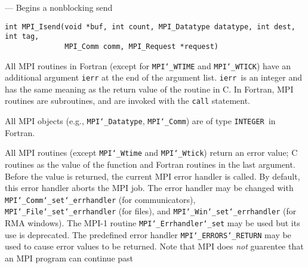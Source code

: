 \startmanpage
{}
--- Begins a nonblocking send 
\startvb\begin{verbatim}
int MPI_Isend(void *buf, int count, MPI_Datatype datatype, int dest, int tag,
              MPI_Comm comm, MPI_Request *request)

\end{verbatim}
\endvb

\par
{}
\par
{}
All MPI routines in Fortran (except for {\tt MPI{\tt \char`\_}WTIME} and {\tt MPI{\tt \char`\_}WTICK}) have
an additional argument {\tt ierr} at the end of the argument list.  {\tt ierr
}is an integer and has the same meaning as the return value of the routine
in C.  In Fortran, MPI routines are subroutines, and are invoked with the
{\tt call} statement.
\par
All MPI objects (e.g., {\tt MPI{\tt \char`\_}Datatype}, {\tt MPI{\tt \char`\_}Comm}) are of type {\tt INTEGER
}in Fortran.
\par
{}
\par
All MPI routines (except {\tt MPI{\tt \char`\_}Wtime} and {\tt MPI{\tt \char`\_}Wtick}) return an error value;
C routines as the value of the function and Fortran routines in the last
argument.  Before the value is returned, the current MPI error handler is
called.  By default, this error handler aborts the MPI job.  The error handler
may be changed with {\tt MPI{\tt \char`\_}Comm{\tt \char`\_}set{\tt \char`\_}errhandler} (for communicators),
{\tt MPI{\tt \char`\_}File{\tt \char`\_}set{\tt \char`\_}errhandler} (for files), and {\tt MPI{\tt \char`\_}Win{\tt \char`\_}set{\tt \char`\_}errhandler} (for
RMA windows).  The MPI-1 routine {\tt MPI{\tt \char`\_}Errhandler{\tt \char`\_}set} may be used but
its use is deprecated.  The predefined error handler
{\tt MPI{\tt \char`\_}ERRORS{\tt \char`\_}RETURN} may be used to cause error values to be returned.
Note that MPI does {\em not} guarentee that an MPI program can continue past
